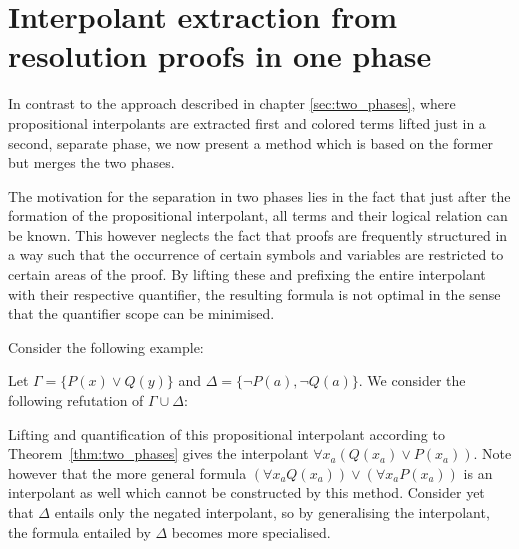\chapter{Interpolant extraction from resolution proofs in one phase}
\label{sec:one_phase}

In contrast to the approach described in chapter \ref{sec:two_phases}, where propositional interpolants are extracted first and colored terms lifted just in a second, separate phase, 
we now present a method which is based on the former but merges the two phases.

The motivation for the separation in two phases lies in the fact that just after the formation of the propositional interpolant, all terms and their logical relation can be known.
This however neglects the fact that proofs are frequently structured in a way such that the occurrence of certain symbols and variables are restricted to certain areas of the proof.
By lifting these and prefixing the entire interpolant with their respective quantifier, the resulting formula is not optimal in the sense that the quantifier scope can be minimised.

Consider the following example:

\begin{exa}
	Let $\Gamma = \{ P(x) \lor Q(y) \}$ and $\Delta = \{\lnot P(a), \lnot Q(a)\}$.
	We consider the following refutation of $\Gamma \cup \Delta$:

	\begin{prooftree}
	\end{prooftree}

	Lifting and quantification of this propositional interpolant according to Theorem~\ref{thm:two_phases} gives the interpolant $\forall x_a (Q(x_a) \lor P(x_a))$.
	Note however that the more general formula $(\forall x_a Q(x_a) ) \lor (\forall x_a P(x_a))$ is an interpolant as well which cannot be constructed by this method.
	Consider yet that $\Delta$ entails only the negated interpolant, so by generalising the interpolant, the formula entailed by $\Delta$ becomes more specialised.
\end{exa}


